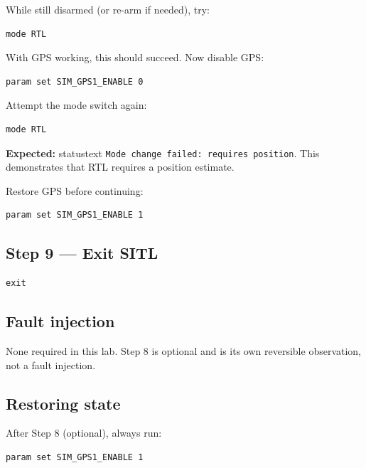 \documentclass[a4paper,11pt,twoside]{article}
\begin{document}
While still disarmed (or re-arm if needed), try:

\begin{Verbatim}[frame=single,fontsize=\small]
mode RTL
\end{Verbatim}

With GPS working, this should succeed. Now disable GPS:

\begin{Verbatim}[frame=single,fontsize=\small]
param set SIM_GPS1_ENABLE 0
\end{Verbatim}

Attempt the mode switch again:

\begin{Verbatim}[frame=single,fontsize=\small]
mode RTL
\end{Verbatim}

\textbf{Expected:} statustext \texttt{Mode change failed: requires position}. This demonstrates that RTL requires a position estimate.

Restore GPS before continuing:

\begin{Verbatim}[frame=single,fontsize=\small]
param set SIM_GPS1_ENABLE 1
\end{Verbatim}

\subsection*{Step 9 --- Exit SITL}

\begin{Verbatim}[frame=single,fontsize=\small]
exit
\end{Verbatim}

\subsection*{Fault injection}

None required in this lab. Step 8 is optional and is its own reversible observation, not a fault injection.

\subsection*{Restoring state}

After Step 8 (optional), always run:

\begin{Verbatim}[frame=single,fontsize=\small]
param set SIM_GPS1_ENABLE 1
\end{Verbatim}
\end{document}
